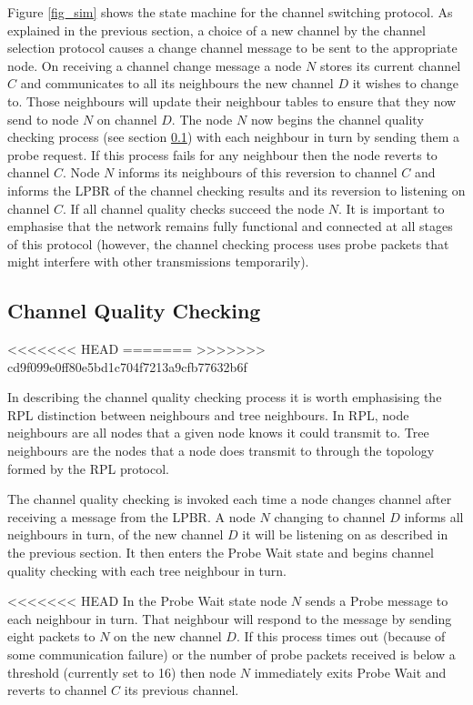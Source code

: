 Figure \ref{fig_sim} shows the state machine for the channel switching protocol.
As explained in the previous section, a choice of a new channel by the channel selection protocol causes a change channel message to be sent to the appropriate node. 
On receiving a channel change message a node $N$ stores its current channel $C$ and communicates to all its neighbours the new channel $D$ it wishes to change to.  Those neighbours will update their neighbour tables to ensure that they now send to node $N$ on channel $D$.  The node $N$ now begins the channel quality checking process (see section \ref{sec:channelquality}) with each neighbour in turn by sending them a probe request.  If this process fails for any neighbour then the node reverts to channel $C$.  Node $N$ informs its neighbours of this reversion to channel $C$ and informs the LPBR of the channel checking results and its reversion to listening on channel $C$. If all channel quality checks succeed the node $N$. It is important to emphasise that the network remains fully functional and connected at all stages of this protocol (however, the channel checking process uses probe packets that might interfere with other transmissions temporarily).

\subsection{Channel Quality Checking}
\label{sec:channelquality}
<<<<<<< HEAD
=======
>>>>>>> cd9f099e0ff80e5bd1c704f7213a9cfb77632b6f

In describing the channel quality checking process it is worth emphasising the RPL distinction between neighbours and tree neighbours. In RPL, node neighbours are all nodes that a given node knows it could transmit to. Tree neighbours are the nodes that a node does transmit to through the topology formed by the RPL protocol.

The channel quality checking is invoked each time a node changes channel after receiving a message from the LPBR. A node $N$ changing to channel $D$ informs all neighbours in turn, of the new channel $D$ it will be listening on as described in the previous section. It then enters the Probe Wait state and begins channel quality checking with each tree neighbour in turn.  

<<<<<<< HEAD
In the Probe Wait state node $N$ sends a Probe message to each neighbour in turn. That neighbour will respond to the message by sending eight packets to $N$ on the new channel $D$. If this process times out (because of some communication failure) or the number of probe packets received is below a threshold (currently set to 16) then node $N$ immediately exits Probe Wait and reverts to channel $C$ its previous channel. 

